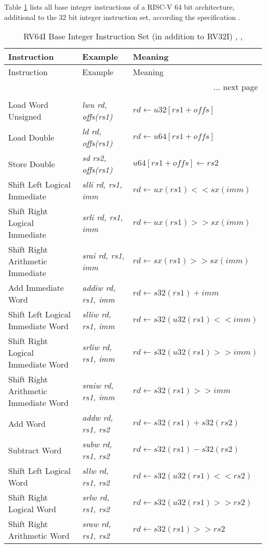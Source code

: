 
Table \ref{tab:asAlu06} lists all base integer instructions of a RISC-V 64 bit architecture, additional to the 32 bit integer instruction set, according the specification \cite{riscvisa03}.
\begin{longtable}{|m{3.5cm}<{\raggedright} |m{3cm}<{\raggedright} |m{5.5cm}<{\raggedright} |} %
\caption{RV64I Base Integer Instruction Set (in addition to RV32I) \cite{riscvisa01}, \cite{riscvisa02}, \cite{riscvisa03}} \\
\hline
Instruction & Example & Meaning    \\
\hline
\endfirsthead
Instruction  & Example  & Meaning    \\
\hline
\endhead
\multicolumn{3}{r}{... next page}\\
\endfoot
\hline
\multicolumn{3}{r}{End of table.} \\
\endlastfoot
Load Word Unsigned & \textit{lwu rd, offs(rs1)} & $rd \leftarrow u32[rs1 + offs]$ \\
\hline
Load Double & \textit{ld rd, offs(rs1)} & $rd \leftarrow u64[rs1 + offs]$ \\
\hline
Store Double & \textit{sd rs2, offs(rs1)} & $u64[rs1 + offs] \leftarrow rs2$ \\
\hline
Shift Left Logical Immediate & \textit{slli rd, rs1, imm} & $rd \leftarrow ux(rs1) << sx(imm)$ \\
\hline
Shift Right Logical Immediate & \textit{srli rd, rs1, imm} & $rd \leftarrow ux(rs1) >> sx(imm)$ \\
\hline
Shift Right Arithmetic Immediate & \textit{srai rd, rs1, imm} & $rd \leftarrow sx(rs1) >> sx(imm)$ \\
\hline
Add Immediate Word & \textit{addiw rd, rs1, imm} & $rd \leftarrow s32(rs1) + imm$ \\
\hline
Shift Left Logical Immediate Word & \textit{slliw rd, rs1, imm} & $rd \leftarrow s32(u32(rs1) << imm)$ \\
\hline
Shift Right Logical Immediate Word& \textit{srliw rd, rs1, imm} & $rd \leftarrow s32(u32(rs1) >> imm)$ \\
\hline
Shift Right Arithmetic Immediate Word& \textit{sraiw rd, rs1, imm} & $rd \leftarrow s32(rs1) >> imm$ \\
\hline
Add Word& \textit{addw rd, rs1, rs2} & $rd \leftarrow s32(rs1) + s32(rs2)$ \\
\hline
Subtract Word& \textit{subw rd, rs1, rs2} & $rd \leftarrow s32(rs1) - s32(rs2)$ \\
\hline
Shift Left Logical Word& \textit{sllw rd, rs1, rs2} & $rd \leftarrow s32(u32(rs1) << rs2)$ \\
\hline
Shift Right Logical Word& \textit{srlw rd, rs1, rs2} & $rd \leftarrow s32(u32(rs1) >> rs2)$ \\
\hline
Shift Right Arithmetic Word& \textit{sraw rd, rs1, rs2}  & $rd \leftarrow s32(rs1) >> rs2$
\label{tab:asAlu06}
\end{longtable}
